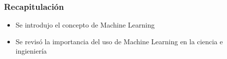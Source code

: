 \documentclass[10pt]{beamer}
\begin{document}
\begin{frame}
\frametitle{Recapitulaci\'on}

\begin{beamerboxesrounded}[upper=uppercolor, lower=lowercolor, shadow=true]{} 

\begin{itemize}

\item Se introdujo el concepto de Machine Learning
\item Se revis\'o la importancia del uso de Machine Learning en la ciencia e ingienier\'ia

\end{itemize}
\end{beamerboxesrounded}

\end{frame}



\begin{frame}
\end{frame}



%
%
%
\end{document}
